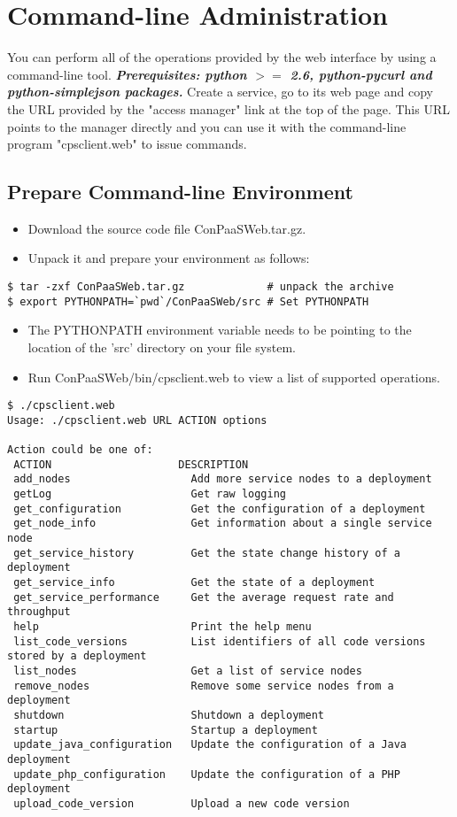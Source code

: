 \documentclass[12pt]{article}
\newenvironment{framedbox}[1]%
{\begin{framed}
 \begingroup
 \fontsize{#1}{#1}\selectfont
}
{
 \endgroup
 \end{framed}
}
\begin{document}
\section{Command-line Administration}
You can perform all of the operations provided by the web interface
by using a command-line tool. \textbf{\emph{Prerequisites: python $>=$ 2.6,
python-pycurl and python-simplejson packages.}}
Create a service, go to its web page and copy the URL provided by the 
"access manager" link at the top of the page. This URL points to the manager
directly and you can use it with the command-line program "cpsclient.web" to
issue commands.

\subsection{Prepare Command-line Environment}
\begin{itemize}
\item Download the source code file ConPaaSWeb.tar.gz.
\item Unpack it and prepare your environment as follows:
\end{itemize}
\begin{framedbox}{12pt}\begin{verbatim}
$ tar -zxf ConPaaSWeb.tar.gz             # unpack the archive
$ export PYTHONPATH=`pwd`/ConPaaSWeb/src # Set PYTHONPATH
\end{verbatim}\end{framedbox}
\begin{itemize}
\item The PYTHONPATH environment variable needs to be pointing to the
      location of the 'src' directory on your file system.
\item Run ConPaaSWeb/bin/cpsclient.web to view a list of supported
      operations.
\end{itemize}
\begin{framedbox}{8pt}\begin{verbatim}
$ ./cpsclient.web
Usage: ./cpsclient.web URL ACTION options

Action could be one of:
 ACTION                    DESCRIPTION
 add_nodes                   Add more service nodes to a deployment
 getLog                      Get raw logging
 get_configuration           Get the configuration of a deployment
 get_node_info               Get information about a single service node
 get_service_history         Get the state change history of a deployment
 get_service_info            Get the state of a deployment
 get_service_performance     Get the average request rate and throughput
 help                        Print the help menu
 list_code_versions          List identifiers of all code versions stored by a deployment
 list_nodes                  Get a list of service nodes
 remove_nodes                Remove some service nodes from a deployment
 shutdown                    Shutdown a deployment
 startup                     Startup a deployment
 update_java_configuration   Update the configuration of a Java deployment
 update_php_configuration    Update the configuration of a PHP deployment
 upload_code_version         Upload a new code version
\end{verbatim}\end{framedbox}
\end{document}
